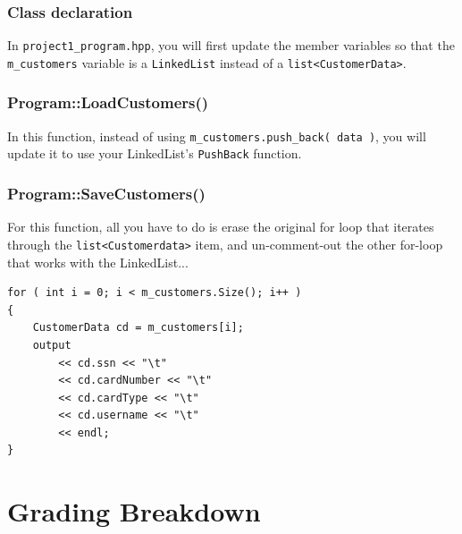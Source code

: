\documentclass[a4paper,12pt,oneside]{book}
\begin{document}
        \subsection{Class declaration}
        
        In \texttt{project1\_program.hpp}, you will first update the member
        variables so that the \texttt{m\_customers} variable is a
        \texttt{LinkedList} instead of a
        \texttt{list<CustomerData>}.
        
        \subsection{Program::LoadCustomers()}
        
        In this function, instead of using 
        \texttt{m\_customers.push\_back( data )}, you will update it
        to use your LinkedList's \texttt{PushBack} function.
        
        \subsection{Program::SaveCustomers()}

        For this function, all you have to do is erase the original
        for loop that iterates through the \texttt{list<Customerdata>}
        item, and un-comment-out the other for-loop that works
        with the LinkedList...
        
\begin{lstlisting}[style=code]
for ( int i = 0; i < m_customers.Size(); i++ )
{
    CustomerData cd = m_customers[i];
    output
        << cd.ssn << "\t"
        << cd.cardNumber << "\t"
        << cd.cardType << "\t"
        << cd.username << "\t"
        << endl;
}
\end{lstlisting} 

    \chapter{Grading Breakdown}
    
\end{document}
